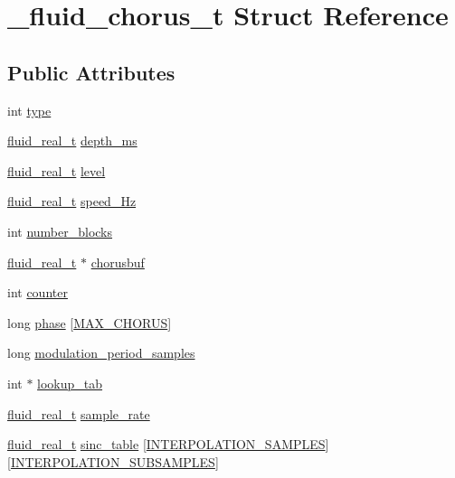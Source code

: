 \hypertarget{struct__fluid__chorus__t}{}\section{\+\_\+fluid\+\_\+chorus\+\_\+t Struct Reference}
\label{struct__fluid__chorus__t}
\subsection*{Public Attributes}
\begin{DoxyCompactItemize}
\item 
int \hyperlink{struct__fluid__chorus__t_acfb4123e8db4196bf4329ec04e04e3ef}{type}
\item 
\hyperlink{fluidsynth__priv_8h_a9e96f0917747b69cabb7c671bc693dbb}{fluid\+\_\+real\+\_\+t} \hyperlink{struct__fluid__chorus__t_aab54bc7efa434bab703f67ec98404fe7}{depth\+\_\+ms}
\item 
\hyperlink{fluidsynth__priv_8h_a9e96f0917747b69cabb7c671bc693dbb}{fluid\+\_\+real\+\_\+t} \hyperlink{struct__fluid__chorus__t_ab3d2901f9f4a73ed9391a8a68f6a88dd}{level}
\item 
\hyperlink{fluidsynth__priv_8h_a9e96f0917747b69cabb7c671bc693dbb}{fluid\+\_\+real\+\_\+t} \hyperlink{struct__fluid__chorus__t_adb880e1d8d336fe02103280029994330}{speed\+\_\+\+Hz}
\item 
int \hyperlink{struct__fluid__chorus__t_afbc36eebc1414f97219b6a0f535343e3}{number\+\_\+blocks}
\item 
\hyperlink{fluidsynth__priv_8h_a9e96f0917747b69cabb7c671bc693dbb}{fluid\+\_\+real\+\_\+t} $\ast$ \hyperlink{struct__fluid__chorus__t_a9b3f6f4c597cb378c167b4774e12b89e}{chorusbuf}
\item 
int \hyperlink{struct__fluid__chorus__t_a8a5b56c3e49d2dfaa5ce025d22ae20e7}{counter}
\item 
long \hyperlink{struct__fluid__chorus__t_a9b180e81c16af49b532014c18b550e3c}{phase} \mbox{[}\hyperlink{fluid__chorus_8c_a3010a4cb537309a7c3204946d21a303b}{M\+A\+X\+\_\+\+C\+H\+O\+R\+US}\mbox{]}
\item 
long \hyperlink{struct__fluid__chorus__t_a2fd9afc73f51a308c225741ae21f3a9f}{modulation\+\_\+period\+\_\+samples}
\item 
int $\ast$ \hyperlink{struct__fluid__chorus__t_abfab325244e8edacaaa23f41b0c8d7a3}{lookup\+\_\+tab}
\item 
\hyperlink{fluidsynth__priv_8h_a9e96f0917747b69cabb7c671bc693dbb}{fluid\+\_\+real\+\_\+t} \hyperlink{struct__fluid__chorus__t_acff10fb60386c6e2e0ec73263851a628}{sample\+\_\+rate}
\item 
\hyperlink{fluidsynth__priv_8h_a9e96f0917747b69cabb7c671bc693dbb}{fluid\+\_\+real\+\_\+t} \hyperlink{struct__fluid__chorus__t_a7bf00ec81f9a6b467c739ed6502ca805}{sinc\+\_\+table} \mbox{[}\hyperlink{fluid__chorus_8c_a0c54606433a6ee64cca093935ac9abed}{I\+N\+T\+E\+R\+P\+O\+L\+A\+T\+I\+O\+N\+\_\+\+S\+A\+M\+P\+L\+ES}\mbox{]}\mbox{[}\hyperlink{fluid__chorus_8c_a50692ae56262616da392b6377e1c960a}{I\+N\+T\+E\+R\+P\+O\+L\+A\+T\+I\+O\+N\+\_\+\+S\+U\+B\+S\+A\+M\+P\+L\+ES}\mbox{]}
\end{DoxyCompactItemize}


